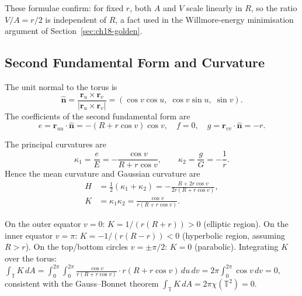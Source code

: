 These formulae confirm: for fixed $r$, both $A$ and $V$ scale linearly in $R$,
so the ratio $V/A = r/2$ is independent of $R$, a fact used in the Willmore-energy
minimisation argument of Section~\ref{sec:ch18-golden}.

\subsection{Second Fundamental Form and Curvature}\label{subsec:ch18-curvature}

The unit normal to the torus is
\begin{equation}
  \hat{\mathbf{n}} = \frac{\mathbf{r}_u \times \mathbf{r}_v}{|\mathbf{r}_u \times \mathbf{r}_v|}
                   = (\cos v\cos u,\; \cos v\sin u,\; \sin v).
\end{equation}
The coefficients of the second fundamental form are
\begin{equation}\label{eq:second-fund}
  e = \mathbf{r}_{uu}\cdot\hat{\mathbf{n}} = -(R+r\cos v)\cos v, \quad
  f = 0, \quad
  g = \mathbf{r}_{vv}\cdot\hat{\mathbf{n}} = -r.
\end{equation}

The principal curvatures are
\begin{equation}\label{eq:principal-curv}
  \kappa_1 = \frac{e}{E} = -\frac{\cos v}{R + r\cos v}, \qquad
  \kappa_2 = \frac{g}{G} = -\frac{1}{r}.
\end{equation}
Hence the mean curvature and Gaussian curvature are
\begin{align}
  H &= \tfrac{1}{2}(\kappa_1 + \kappa_2)
     = -\frac{R + 2r\cos v}{2r(R+r\cos v)}, \label{eq:mean-curv}\\
  K &= \kappa_1\kappa_2
     = \frac{\cos v}{r(R+r\cos v)}. \label{eq:gauss-curv}
\end{align}

\begin{remark}\label{rem:gauss-sign}
On the outer equator $v = 0$: $K = 1/(r(R+r)) > 0$ (elliptic region).
On the inner equator $v = \pi$: $K = -1/(r(R-r)) < 0$ (hyperbolic region, assuming $R > r$).
On the top/bottom circles $v = \pm\pi/2$: $K = 0$ (parabolic).
Integrating $K$ over the torus:
\(
  \int_{\mathbb{T}} K\, dA = \int_0^{2\pi}\int_0^{2\pi} \frac{\cos v}{r(R+r\cos v)}\cdot r(R+r\cos v)\, du\, dv
  = 2\pi \int_0^{2\pi}\cos v\, dv = 0,
\)
consistent with the Gauss--Bonnet theorem $\int_{\mathbb{T}} K\, dA = 2\pi\chi(\mathbb{T}^2) = 0$.
\end{remark}

